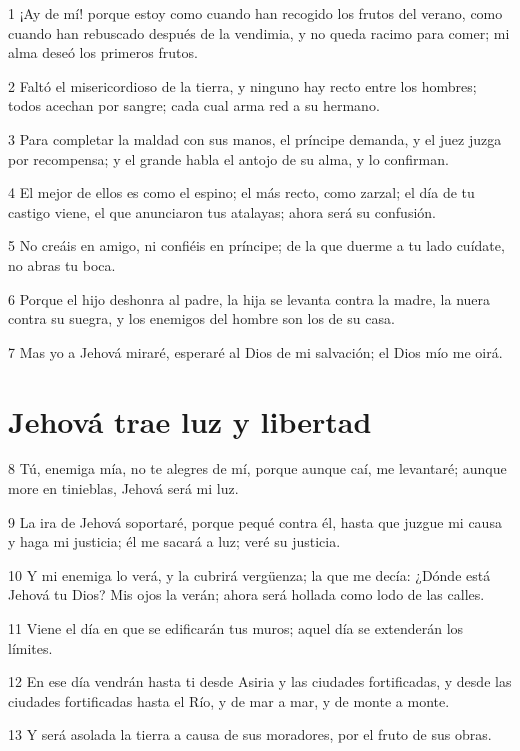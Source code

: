 \par 1 ¡Ay de mí! porque estoy como cuando han recogido los frutos del verano, como cuando han rebuscado después de la vendimia, y no queda racimo para comer; mi alma deseó los primeros frutos.
\par 2 Faltó el misericordioso de la tierra, y ninguno hay recto entre los hombres; todos acechan por sangre; cada cual arma red a su hermano.
\par 3 Para completar la maldad con sus manos, el príncipe demanda, y el juez juzga por recompensa; y el grande habla el antojo de su alma, y lo confirman.
\par 4 El mejor de ellos es como el espino; el más recto, como zarzal; el día de tu castigo viene, el que anunciaron tus atalayas; ahora será su confusión.
\par 5 No creáis en amigo, ni confiéis en príncipe; de la que duerme a tu lado cuídate, no abras tu boca.
\par 6 Porque el hijo deshonra al padre, la hija se levanta contra la madre, la nuera contra su suegra, y los enemigos del hombre son los de su casa. 
\par 7 Mas yo a Jehová miraré, esperaré al Dios de mi salvación; el Dios mío me oirá.

\section*{Jehová trae luz y libertad}

\par 8 Tú, enemiga mía, no te alegres de mí, porque aunque caí, me levantaré; aunque more en tinieblas, Jehová será mi luz.
\par 9 La ira de Jehová soportaré, porque pequé contra él, hasta que juzgue mi causa y haga mi justicia; él me sacará a luz; veré su justicia.
\par 10 Y mi enemiga lo verá, y la cubrirá vergüenza; la que me decía: ¿Dónde está Jehová tu Dios? Mis ojos la verán; ahora será hollada como lodo de las calles.
\par 11 Viene el día en que se edificarán tus muros; aquel día se extenderán los límites.
\par 12 En ese día vendrán hasta ti desde Asiria y las ciudades fortificadas, y desde las ciudades fortificadas hasta el Río, y de mar a mar, y de monte a monte.
\par 13 Y será asolada la tierra a causa de sus moradores, por el fruto de sus obras.

